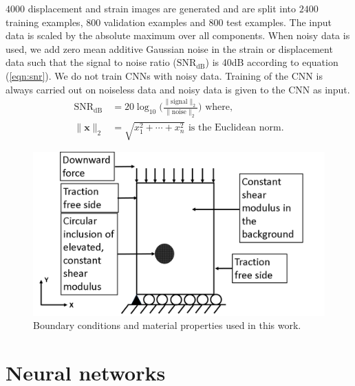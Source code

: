 \documentclass[10pt]{article}
\begin{document}
$4000$ displacement and strain images are generated and are split into $2400$ training examples, $800$ validation examples and $800$ test examples. The input data is scaled by the absolute maximum over all components. When noisy data is used, we add zero mean additive Gaussian noise in the strain or displacement data such that the signal to noise ratio ($\text{SNR}_{\text{dB}}$) is 40dB according to equation (\ref{eqn:snr}). We do not train CNNs with noisy data. Training of the CNN is always carried out on noiseless data and noisy data is given to the CNN as input.
\begin{subequations}
\begin{align}
  \text{SNR}_{\text{dB}} &= 20\log_{10}{\Bigg (}\frac{\|\text{signal}\|_{2}}{\|\text{noise}\|_{2}}{\Bigg )} \label{eqn:snr} \text{ where, }\\
  \|\mathbf{x}\|_{2} &= \sqrt{x_{1}^{2}+\cdots+x_{n}^2}  \text{ is the Euclidean norm.}   \label{eqn:eucnorm}
\end{align}
\end{subequations}  
%
\begin{figure}[!h] 
   \centering
    \includegraphics[totalheight=5cm]{Figures/bc.png}
  \caption{\label{fig:bc}Boundary conditions and material properties used in this work. }
\end{figure}
%
\section{Neural networks}
\end{document}
